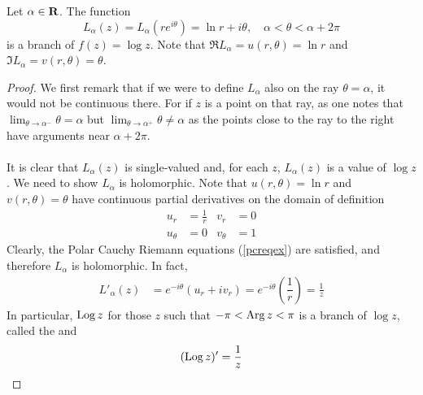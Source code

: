 \medskip

\begin{proposition}\label{logbranch}
Let $\alpha \in \mathbf R$. The function
\[L_{\alpha}(z) = L_{\alpha}(re^{i\theta}) = \ln r + i\theta,\quad \alpha < \theta < \alpha + 2\pi\]
is a branch of $f(z) = \log z$. Note that $\Re L_\alpha = u(r,\theta) = \ln r$ and $\Im L_\alpha = v(r,\theta) = \theta$.
\end{proposition}
\begin{proof}
We first remark that if we were to define $L_\alpha$ also on the ray $\theta = \alpha$, it would not be continuous there. For if $z$ is a point on that ray, as one notes that $\lim_{\theta \to \alpha^-}\theta = \alpha$ but $\lim_{\theta \to \alpha^+}\theta \neq \alpha$ as the points close to the ray to the right have arguments near $\alpha + 2\pi$.\\
\\
It is clear that $L_\alpha(z)$ is single-valued and, for each $z$, $L_\alpha(z)$ is a value of $\log z$. We need to show $L_\alpha$ is holomorphic. Note that $u(r,\theta) = \ln r$ and $v(r,\theta) = \theta$ have continuous partial derivatives on the domain of definition
\begin{align*}
u_r &= \frac{1}{r} & v_r &= 0\\[0.5em]
u_\theta &= 0 & v_\theta &= 1
\end{align*}
Clearly, the Polar Cauchy Riemann equations (\ref{pcreqex}) are satisfied, and therefore $L_\alpha$ is holomorphic. In fact,
\begin{align*}
L'_\alpha(z) &= e^{-i\theta} (u_r + iv_r) = e^{-i\theta}\left(\dfrac{1}{r}\right) = \frac{1}{z}
\end{align*}
In particular, $\operatorname{Log} z$ for those $z$ such that $-\pi < \operatorname{Arg} z < \pi$ is a branch of $\log z$, called the   and 
\[(\operatorname{Log} z)' = \frac{1}{z}\]
\end{proof}

\medskip

